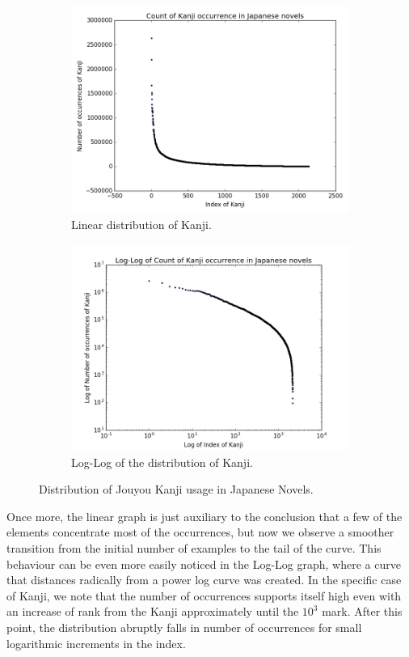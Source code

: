 \begin{figure}[ht]
    \centering
    \begin{subfigure}{0.475\textwidth}
    \centering
    \includegraphics[width=0.9\linewidth]{Cap2/KanjiCountNovels}
    \caption{Linear distribution of Kanji.}
    \label{fig:linearkanjicount}
    \end{subfigure}
    \begin{subfigure}{0.475\textwidth}
    \centering
    \includegraphics[width=0.9\linewidth]{Cap2/LogLogKanjiCountNovels}
    \caption{Log-Log of the distribution of Kanji.}
    \label{fig:logkanjicount}
    \end{subfigure}
    
    \caption{Distribution of Jouyou Kanji usage in Japanese Novels.}
    \label{fig:kanjicount}
\end{figure}

Once more, the linear graph is just auxiliary to the conclusion that a few of the elements concentrate most of the occurrences, but now we observe a smoother transition from the initial number of examples to the tail of the curve. This behaviour can be even more easily noticed in the Log-Log graph, where a curve that distances radically from a power log curve was created. In the specific case of Kanji, we note that the number of occurrences supports itself high even with an increase of rank from the Kanji approximately until the \(10^3\) mark. After this point, the distribution abruptly falls in number of occurrences for small logarithmic increments in the index.

